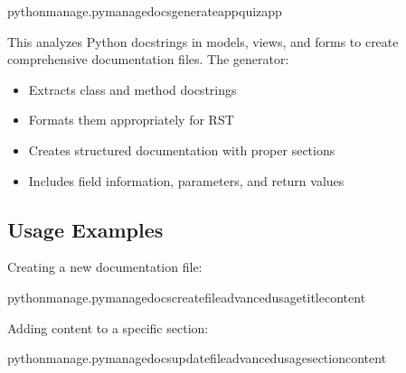 \documentclass[letterpaper,10pt,english]{sphinxmanual}
\begin{document}
\begin{sphinxVerbatim}[commandchars=\\\{\}]
pythonmanage.pymanage\PYGZus{}docsgenerate\PYGZhy{}\PYGZhy{}appquiz\PYGZus{}app
\end{sphinxVerbatim}

\sphinxAtStartPar
This analyzes Python docstrings in models, views, and forms to create comprehensive documentation files. The generator:
\begin{itemize}
\item {} 
\sphinxAtStartPar
Extracts class and method docstrings

\item {} 
\sphinxAtStartPar
Formats them appropriately for RST

\item {} 
\sphinxAtStartPar
Creates structured documentation with proper sections

\item {} 
\sphinxAtStartPar
Includes field information, parameters, and return values

\end{itemize}


\subsection{Usage Examples}
\label{\detokenize{documentation_tools:usage-examples}}
\sphinxAtStartPar
Creating a new documentation file:

\begin{sphinxVerbatim}[commandchars=\\\{\}]
pythonmanage.pymanage\PYGZus{}docscreate\PYGZhy{}\PYGZhy{}fileadvanced\PYGZus{}usage\PYGZhy{}\PYGZhy{}title\PYGZhy{}\PYGZhy{}content
\end{sphinxVerbatim}

\sphinxAtStartPar
Adding content to a specific section:

\begin{sphinxVerbatim}[commandchars=\\\{\}]
pythonmanage.pymanage\PYGZus{}docsupdate\PYGZhy{}\PYGZhy{}fileadvanced\PYGZus{}usage\PYGZhy{}\PYGZhy{}section\PYGZhy{}\PYGZhy{}content
\end{sphinxVerbatim}
\end{document}

